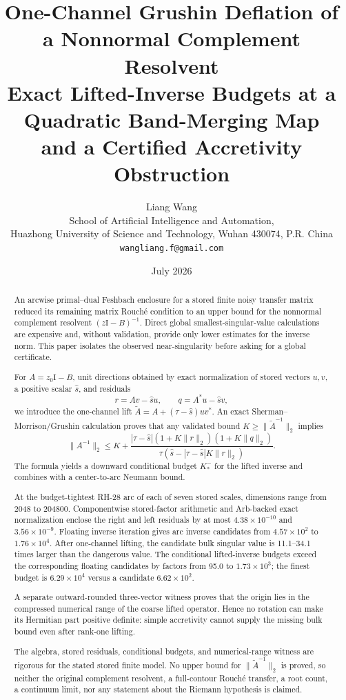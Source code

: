 \documentclass[11pt]{article}
\title{\textbf{One-Channel Grushin Deflation of a Nonnormal Complement Resolvent}\\[0.35em]
\large Exact Lifted-Inverse Budgets at a Quadratic Band-Merging Map\\
and a Certified Accretivity Obstruction}
\author{Liang Wang\\
\small School of Artificial Intelligence and Automation,\\[-0.2em]
\small Huazhong University of Science and Technology, Wuhan 430074, P.R. China\\
\small \texttt{wangliang.f@gmail.com}}
\date{July 2026}
\theoremstyle{definition}
\theoremstyle{remark}
\newcommand{\Id}{\mathrm I}
\begin{document}
\maketitle

\begin{abstract}
An arcwise primal--dual Feshbach enclosure for a stored finite noisy transfer
matrix reduced its remaining matrix Rouché condition to an upper bound for
the nonnormal complement resolvent $(z\Id-B)^{-1}$.  Direct global
smallest-singular-value calculations are expensive and, without validation,
provide only lower estimates for the inverse norm.  This paper isolates the
observed near-singularity before asking for a global certificate.

For $A=z_0\Id-B$, unit directions obtained by exact normalization of stored
vectors $u,v$, a positive scalar
$\widehat s$, and residuals
\[
 r=Av-\widehat s u,\qquad q=A^*u-\widehat s v,
\]
we introduce the one-channel lift
$\widetilde A=A+(\tau-\widehat s)uv^*$.  An exact
Sherman--Morrison/Grushin calculation proves that any validated bound
$K\geq\|\widetilde A^{-1}\|_2$ implies
\[
 \|A^{-1}\|_2\leq
 K+\frac{|\tau-\widehat s|(1+K\|r\|_2)(1+K\|q\|_2)}
 {\tau(\widehat s-|\tau-\widehat s|K\|r\|_2)}.
\]
The formula yields a downward conditional budget $K_*^-$ for the lifted
inverse and combines with a center-to-arc Neumann bound.

At the budget-tightest RH-28 arc of each of seven stored scales, dimensions
range from 2048 to 204800.  Componentwise stored-factor arithmetic and
Arb-backed exact normalization enclose the right and left residuals by at
most $4.38\times10^{-10}$ and $3.56\times10^{-9}$.  Floating inverse
iteration gives arc inverse candidates from $4.57\times10^2$ to
$1.76\times10^4$.  After one-channel lifting, the candidate bulk singular
value is 11.1--34.1 times larger than the dangerous value.  The conditional
lifted-inverse budgets exceed the corresponding floating candidates by
factors from 95.0 to $1.73\times10^3$; the finest budget is
$6.29\times10^4$ versus a candidate $6.62\times10^2$.

A separate outward-rounded three-vector witness proves that the origin lies
in the compressed numerical range of the coarse lifted operator.  Hence no
rotation can make its Hermitian part positive definite: simple accretivity
cannot supply the missing bulk bound even after rank-one lifting.

The algebra, stored residuals, conditional budgets, and numerical-range
witness are rigorous for the stated stored finite model.  No upper bound for
$\|\widetilde A^{-1}\|_2$ is proved, so neither the original complement
resolvent, a full-contour Rouché transfer, a root count, a continuum limit,
nor any statement about the Riemann hypothesis is claimed.
\end{abstract}
\end{document}

